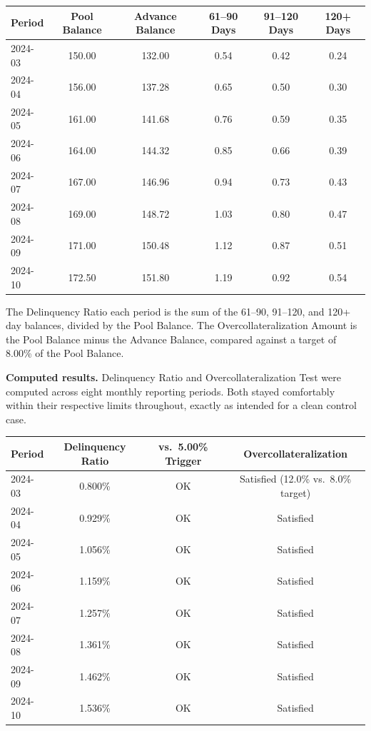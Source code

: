 \documentclass[11pt,a4paper]{article}
\begin{document}
\begin{center}
\renewcommand{\arraystretch}{1.25}
\small
\begin{tabular}{@{}lccccc@{}}
\toprule
\textbf{Period} & \textbf{Pool Balance} & \textbf{Advance Balance} & \textbf{61--90 Days} & \textbf{91--120 Days} & \textbf{120+ Days} \\
\midrule
2024-03 & 150.00 & 132.00 & 0.54 & 0.42 & 0.24 \\
2024-04 & 156.00 & 137.28 & 0.65 & 0.50 & 0.30 \\
2024-05 & 161.00 & 141.68 & 0.76 & 0.59 & 0.35 \\
2024-06 & 164.00 & 144.32 & 0.85 & 0.66 & 0.39 \\
2024-07 & 167.00 & 146.96 & 0.94 & 0.73 & 0.43 \\
2024-08 & 169.00 & 148.72 & 1.03 & 0.80 & 0.47 \\
2024-09 & 171.00 & 150.48 & 1.12 & 0.87 & 0.51 \\
2024-10 & 172.50 & 151.80 & 1.19 & 0.92 & 0.54 \\
\bottomrule
\end{tabular}
\end{center}

The Delinquency Ratio each period is the sum of the 61--90, 91--120, and 120+ day balances, divided by the Pool Balance. The Overcollateralization Amount is the Pool Balance minus the Advance Balance, compared against a target of 8.00\% of the Pool Balance.

\textbf{Computed results.} Delinquency Ratio and Overcollateralization Test were computed across eight monthly reporting periods. Both stayed comfortably within their respective limits throughout, exactly as intended for a clean control case.

\begin{center}
\renewcommand{\arraystretch}{1.25}
\small
\begin{tabular}{@{}lccc@{}}
\toprule
\textbf{Period} & \textbf{Delinquency Ratio} & \textbf{vs.\ 5.00\% Trigger} & \textbf{Overcollateralization} \\
\midrule
2024-03 & 0.800\% & OK & Satisfied (12.0\% vs.\ 8.0\% target) \\
2024-04 & 0.929\% & OK & Satisfied \\
2024-05 & 1.056\% & OK & Satisfied \\
2024-06 & 1.159\% & OK & Satisfied \\
2024-07 & 1.257\% & OK & Satisfied \\
2024-08 & 1.361\% & OK & Satisfied \\
2024-09 & 1.462\% & OK & Satisfied \\
2024-10 & 1.536\% & OK & Satisfied \\
\bottomrule
\end{tabular}
\end{center}
\end{document}
